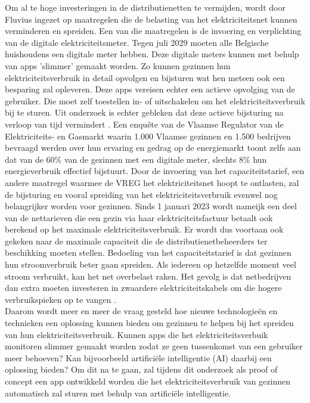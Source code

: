 Om al te hoge investeringen in de distributienetten te vermijden, wordt door Fluvius ingezet op maatregelen die de belasting van het elektriciteitsnet kunnen verminderen en spreiden. Een van die maatregelen is de invoering en verplichting van de digitale elektriciteitsmeter. Tegen juli 2029 moeten alle Belgische huishoudens een digitale meter hebben. Deze digitale meters kunnen met behulp van apps 'slimmer' gemaakt worden. Zo kunnen gezinnen hun elektriciteitsverbruik in detail opvolgen en bijsturen wat hen meteen ook een besparing zal opleveren. Deze apps vereisen echter een actieve opvolging van de gebruiker. Die moet zelf toestellen in- of uitschakelen om het elektriciteitsverbruik bij te sturen. Uit onderzoek is echter gebleken dat deze actieve bijsturing na verloop van tijd vermindert \autocite{Wemyss2019}. Een enquête van de Vlaamse Regulator van de Elektriciteits- en Gasmarkt \textcite{VREG2021} waarin 1.000 Vlaamse gezinnen en 1.500 bedrijven bevraagd werden over hun ervaring en gedrag op de energiemarkt toont zelfs aan dat van de 60\% van de gezinnen met een digitale meter, slechts 8\% hun energieverbruik effectief bijstuurt. Door de invoering van het capaciteitstarief, een andere maatregel waarmee de VREG het elektriciteitsnet hoopt te ontlasten, zal de bijsturing en vooral spreiding van het elektriciteitsverbruik evenwel nog belangrijker worden voor gezinnen. Sinds 1 januari 2023 wordt nameijk een deel van de nettarieven die een gezin via haar elektriciteitsfactuur betaalt ook berekend op het maximale elektriciteitsverbruik. Er wordt dus voortaan ook gekeken naar de maximale capaciteit die de distributienetbeheerders ter beschikking moeten stellen. Bedoeling van het capaciteitstarief is dat gezinnen hun stroomverbruik beter gaan spreiden. Als iedereen op hetzelfde moment veel stroom verbruikt, kan het net overbelast raken. Het gevolg is dat netbedrijven dan extra moeten investeren in zwaardere elektriciteitskabels om die hogere verbruikspieken op te vangen \autocite{Selleslagh2022}. \\

Daarom wordt meer en meer de vraag gesteld hoe nieuwe technologieën en technieken een oplossing kunnen bieden om gezinnen te helpen bij het spreiden van hun elektriciteitsverbruik. Kunnen apps die het elektriciteitsverbuik monitoren slimmer gemaakt worden zodat ze geen tussenkomst van een gebruiker meer behoeven? Kan bijvoorbeeld artificiële intelligentie (AI) daarbij een oplossing bieden? Om dit na te gaan, zal tijdens dit onderzoek als proof of concept een app ontwikkeld worden die het elektriciteitsverbruik van gezinnen automatisch zal sturen met behulp van artificiële intelligentie.

